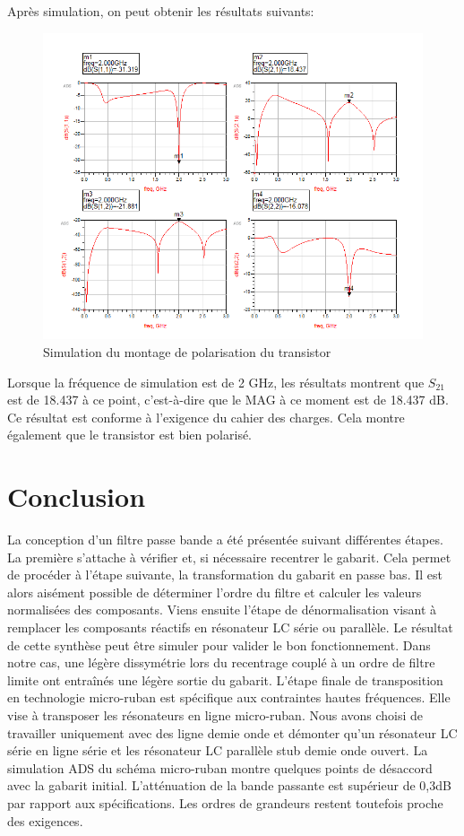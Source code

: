 \documentclass[french]{article}
\begin{document}
Après simulation, on peut obtenir les résultats suivants:
\begin{figure}[H]
	\centering
	\includegraphics[width=\linewidth]{../5SynthAmp/polarisation_Sparametres}
	\caption{Simulation du montage de polarisation du transistor}
	\label{fig:polarisation_simu}
\end{figure}

Lorsque la fréquence de simulation est de 2 GHz, les résultats montrent que $S_{21}$ est de 18.437 à ce point, c'est-à-dire que le MAG à ce moment est de 18.437 dB. Ce résultat est conforme à l'exigence du cahier des charges. Cela montre également que le transistor est bien polarisé.


\newpage
\section{Conclusion}

La conception d'un filtre passe bande a été présentée suivant différentes étapes. La première s'attache à vérifier et, si nécessaire recentrer le gabarit. Cela permet de procéder à l'étape suivante, la transformation du gabarit en passe bas. Il est alors aisément possible de déterminer l'ordre du filtre et calculer les valeurs normalisées des composants. Viens ensuite l'étape de dénormalisation visant à remplacer les composants réactifs en résonateur LC série ou parallèle. Le résultat de cette synthèse peut être simuler pour valider le bon fonctionnement. Dans notre cas, une légère dissymétrie lors du recentrage couplé à un ordre de filtre limite ont entraînés une légère sortie du gabarit. L'étape finale de transposition en technologie micro-ruban est spécifique aux contraintes hautes fréquences. Elle vise à transposer les résonateurs en ligne micro-ruban. Nous avons choisi de travailler uniquement avec des ligne demie onde et démonter qu'un résonateur LC série en ligne série et les résonateur LC parallèle stub demie onde ouvert. La simulation ADS du schéma micro-ruban montre quelques points de désaccord avec la gabarit initial. L'atténuation de la bande passante est supérieur de 0,3dB par rapport aux spécifications. Les ordres de grandeurs restent toutefois proche des exigences.  
\end{document}
